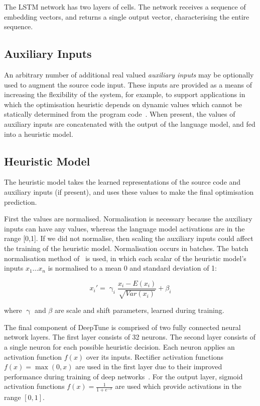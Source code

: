 The LSTM network has two layers of cells. The network receives a sequence of embedding vectors, and returns a single output vector, characterising the entire sequence.


\subsection{Auxiliary Inputs}

An arbitrary number of additional real valued \emph{auxiliary inputs} may be optionally used to augment the source code input. These inputs are provided as a means of increasing the flexibility of the system, for example, to support applications in which the optimisation heuristic depends on dynamic values which cannot be statically determined from the program code~\cite{Ding2015,Stephenson2005}. When present, the values of auxiliary inputs are concatenated with the output of the language model, and fed into a heuristic model.


\subsection{Heuristic Model}

The heuristic model takes the learned representations of the source code and auxiliary inputs (if present), and uses these values to make the final optimisation prediction.

First the values are normalised. Normalisation is necessary because the auxiliary inputs can have any values, whereas the language model activations are in the range [0,1]. If we did not normalise, then scaling the auxiliary inputs could affect the training of the heuristic model. Normalisation occurs in batches. The batch normalisation method of~\cite{Ioffe2015a} is used, in which each scalar of the heuristic model's inputs $x_1 \ldots x_n$ is normalised to a mean 0 and standard deviation of 1:

\begin{equation}
x_i' = \upgamma_i \frac{x_i - E(x_i)}{\sqrt{Var(x_i)}} + \beta_i
\end{equation}

where $\upgamma$ and $\beta$ are scale and shift parameters, learned during training.

The final component of DeepTune is comprised of two fully connected neural network layers. The first layer consists of 32 neurons. The second layer consists of a single neuron for each possible heuristic decision. Each neuron applies an activation function $f(x)$ over its inputs. Rectifier activation functions $f(x) = \max(0, x)$ are used in the first layer due to their improved performance during training of deep networks~\cite{Nair2010}. For the output layer, sigmoid activation functions $f(x) = \frac{1}{1+e^{-x}}$ are used which provide activations in the range $[0,1]$.

